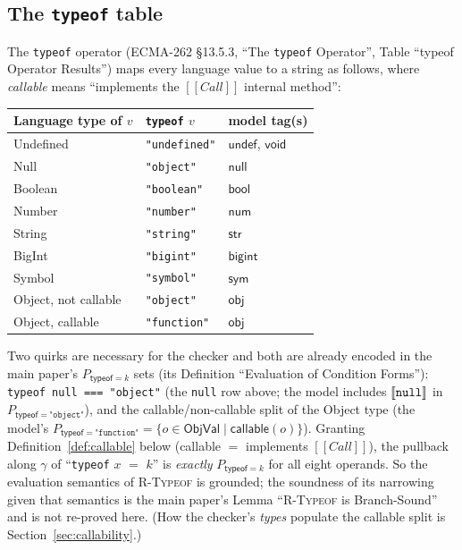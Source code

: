 \documentclass[11pt]{article}
\newcommand{\ObjVal}{\mathsf{ObjVal}}
\newcommand{\realize}{\gamma}
\newcommand{\ecma}[1]{ECMA-262 \S#1}
\newcommand{\intm}[1]{[[#1]]}
\begin{document}
\subsection{The \texttt{typeof} table}
\label{sec:typeof-table}

The \texttt{typeof} operator (\ecma{13.5.3}, ``The \texttt{typeof}
Operator'', Table ``typeof Operator Results'') maps every language value
to a string as follows, where \emph{callable} means ``implements the
$\intm{Call}$ internal method'':

\begin{center}
\renewcommand{\arraystretch}{1.15}
\begin{tabular}{@{}lll@{}}
\toprule
Language type of $v$ & \texttt{typeof} $v$ & model tag(s) \\
\midrule
Undefined & \texttt{"undefined"} & $\mathsf{undef}$, $\mathsf{void}$ \\
Null & \texttt{"object"} & $\mathsf{null}$ \\
Boolean & \texttt{"boolean"} & $\mathsf{bool}$ \\
Number & \texttt{"number"} & $\mathsf{num}$ \\
String & \texttt{"string"} & $\mathsf{str}$ \\
BigInt & \texttt{"bigint"} & $\mathsf{bigint}$ \\
Symbol & \texttt{"symbol"} & $\mathsf{sym}$ \\
Object, not callable & \texttt{"object"} & $\mathsf{obj}$ \\
Object, callable & \texttt{"function"} & $\mathsf{obj}$ \\
\bottomrule
\end{tabular}
\end{center}

Two quirks are necessary for the checker and both are already encoded
in the main paper's $P_{\mathsf{typeof}=k}$ sets (its Definition
``Evaluation of Condition Forms''):
\texttt{typeof null === "object"} (the \texttt{null} row above; the model
includes $\llbracket \texttt{null} \rrbracket$ in $P_{\mathsf{typeof}=\texttt{"object"}}$),
and the callable/non-callable split of the Object type (the model's
$P_{\mathsf{typeof}=\texttt{"function"}} = \{o \in \ObjVal \mid
\mathsf{callable}(o)\}$). Granting Definition~\ref{def:callable} below
(callable $=$ implements $\intm{Call}$), the pullback along $\realize$ of
``\texttt{typeof} $x$ $=$ $k$'' is \emph{exactly}
$P_{\mathsf{typeof}=k}$ for all eight operands. So the evaluation
semantics of \textsc{R-Typeof} is grounded; the soundness of its
narrowing given that semantics is the main paper's Lemma
``\textsc{R-Typeof} is Branch-Sound'' and is not
re-proved here. (How the checker's \emph{types} populate the callable
split is Section~\ref{sec:callability}.)
\end{document}

